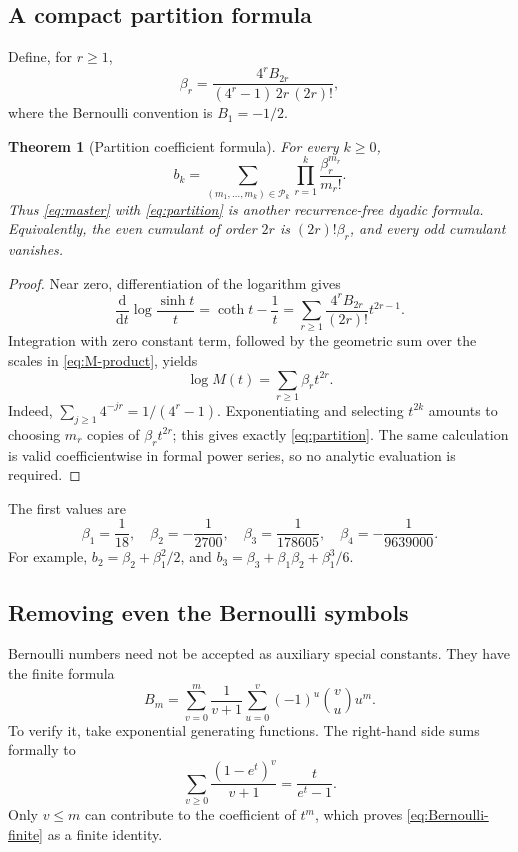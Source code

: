 \documentclass[11pt,a4paper]{article}
\newtheorem{theorem}{Theorem}[section]
\theoremstyle{definition}
\theoremstyle{remark}
\newcommand{\Part}{\mathcal P}
\begin{document}
\subsection{A compact partition formula}
Define, for \(r\geq1\),
\begin{equation}
 \beta_r=\frac{4^r B_{2r}}{(4^r-1)\,2r\,(2r)!},           \label{eq:beta}
\end{equation}
where the Bernoulli convention is \(B_1=-1/2\).
\begin{theorem}[Partition coefficient formula]
\label{thm:partition}
For every \(k\geq0\),
\begin{equation}
 \boxed{\displaystyle
 b_k=\sum_{(m_1,\ldots,m_k)\in\Part_k}
       \prod_{r=1}^{k}\frac{\beta_r^{m_r}}{m_r!}.}         \label{eq:partition}
\end{equation}
Thus \eqref{eq:master} with \eqref{eq:partition} is another recurrence-free dyadic
formula.  Equivalently, the even cumulant of order \(2r\) is \((2r)!\beta_r\),
and every odd cumulant vanishes.
\end{theorem}
\begin{proof}
Near zero, differentiation of the logarithm gives
\[
 \frac{\mathrm d}{\mathrm dt}\log\frac{\sinh t}{t}
 =\coth t-\frac1t
 =\sum_{r\geq1}\frac{4^r B_{2r}}{(2r)!}t^{2r-1}.
\]
Integration with zero constant term, followed by the geometric sum over the
scales in \eqref{eq:M-product}, yields
\begin{equation}
 \log M(t)=\sum_{r\geq1}\beta_r t^{2r}.                   \label{eq:log-M}
\end{equation}
Indeed, \(\sum_{j\geq1}4^{-jr}=1/(4^r-1)\).  Exponentiating and selecting
\(t^{2k}\) amounts to choosing \(m_r\) copies of \(\beta_r t^{2r}\); this gives
exactly \eqref{eq:partition}.  The same calculation is valid coefficientwise in
formal power series, so no analytic evaluation is required.
\end{proof}
The first values are
\begin{equation}
 \beta_1=\frac1{18},\quad \beta_2=-\frac1{2700},\quad
 \beta_3=\frac1{178605},\quad \beta_4=-\frac1{9639000}.
                                                               \label{eq:beta-values}
\end{equation}
For example, \(b_2=\beta_2+\beta_1^2/2\), and
\(b_3=\beta_3+\beta_1\beta_2+\beta_1^3/6\).

\subsection{Removing even the Bernoulli symbols}
Bernoulli numbers need not be accepted as auxiliary special constants.  They have
the finite formula
\begin{equation}
 B_m=\sum_{v=0}^{m}\frac1{v+1}
       \sum_{u=0}^{v}(-1)^u\binom vu u^m.                \label{eq:Bernoulli-finite}
\end{equation}
To verify it, take exponential generating functions.  The right-hand side sums
formally to
\[
 \sum_{v\geq0}\frac{(1-e^t)^v}{v+1}
 =\frac{t}{e^t-1}.
\]
Only \(v\leq m\) can contribute to the coefficient of \(t^m\), which proves
\eqref{eq:Bernoulli-finite} as a finite identity.
\end{document}
